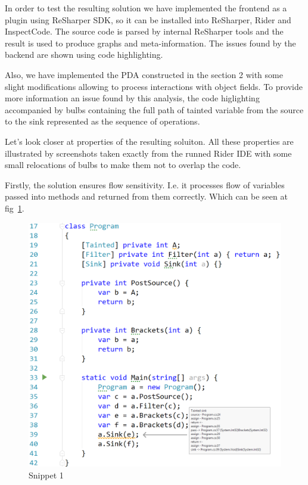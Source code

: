 In order to test the resulting solution we have implemented the frontend as a plugin using ReSharper SDK, so it can be installed into ReSharper, Rider and InspectCode.
The source code is parsed by internal ReSharper tools and the result is used to produce graphs and meta-information.
The issues found by the backend are shown using code highlighting.

Also, we have implemented the PDA constructed in the section 2 with some slight modifications allowing to process interactions with object fields.
To provide more information an issue found by this analysis, the code higlighting accompanied by bulbs containing the full path of tainted variable from the source to the sink represented as the sequence of operations.

Let's look closer at properties of the resulting soluiton.
All these properties are illustrated by screenshots taken exactly from the runned Rider IDE with some small relocations of bulbs to make them not to overlap the code.

Firstly, the solution ensures flow sensitivity. I.e. it processes flow of variables passed into methods and returned from them correctly.
Which can be seen at fig~\ref{fig:ReturnsAndBrackets}.

\begin{figure}[h]
	\includegraphics[width=\linewidth]{screenshots/ReturnsAndBrackets.png}
	\caption{Snippet 1}
	\label{fig:ReturnsAndBrackets}
\end{figure}

